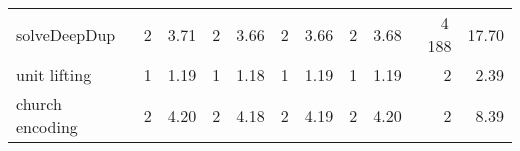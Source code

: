 \begin{tabular}{lrrrrrrrrrr}
\textsf{solveDeepDup}& {\def\@currentlabel{2}\label{stats:SolveDeepDup:Unshared:mem}2} & {\def\@currentlabel{3.71}\label{stats:SolveDeepDup:Unshared:time}3.71}& {\def\@currentlabel{2}\label{stats:SolveDeepDup:Shared:mem}2} & {\def\@currentlabel{3.66}\label{stats:SolveDeepDup:Shared:time}3.66}& {\def\@currentlabel{2}\label{stats:SolveDeepDup:SharedThunk:mem}2} & {\def\@currentlabel{3.66}\label{stats:SolveDeepDup:SharedThunk:time}3.66}& {\def\@currentlabel{2}\label{stats:SolveDeepDup:SharedEvaled:mem}2} & {\def\@currentlabel{3.68}\label{stats:SolveDeepDup:SharedEvaled:time}3.68}& {\def\@currentlabel{4\,188}\label{stats:SolveDeepDup:SharedFull:mem}4\,188} & {\def\@currentlabel{17.70}\label{stats:SolveDeepDup:SharedFull:time}17.70} \\
unit lifting& {\def\@currentlabel{1}\label{stats:Unit:Unshared:mem}1} & {\def\@currentlabel{1.19}\label{stats:Unit:Unshared:time}1.19}& {\def\@currentlabel{1}\label{stats:Unit:Shared:mem}1} & {\def\@currentlabel{1.18}\label{stats:Unit:Shared:time}1.18}& {\def\@currentlabel{1}\label{stats:Unit:SharedThunk:mem}1} & {\def\@currentlabel{1.19}\label{stats:Unit:SharedThunk:time}1.19}& {\def\@currentlabel{1}\label{stats:Unit:SharedEvaled:mem}1} & {\def\@currentlabel{1.19}\label{stats:Unit:SharedEvaled:time}1.19}& {\def\@currentlabel{2}\label{stats:Unit:SharedFull:mem}2} & {\def\@currentlabel{2.39}\label{stats:Unit:SharedFull:time}2.39} \\
church encoding& {\def\@currentlabel{2}\label{stats:Church:Unshared:mem}2} & {\def\@currentlabel{4.20}\label{stats:Church:Unshared:time}4.20}& {\def\@currentlabel{2}\label{stats:Church:Shared:mem}2} & {\def\@currentlabel{4.18}\label{stats:Church:Shared:time}4.18}& {\def\@currentlabel{2}\label{stats:Church:SharedThunk:mem}2} & {\def\@currentlabel{4.19}\label{stats:Church:SharedThunk:time}4.19}& {\def\@currentlabel{2}\label{stats:Church:SharedEvaled:mem}2} & {\def\@currentlabel{4.20}\label{stats:Church:SharedEvaled:time}4.20}& {\def\@currentlabel{2}\label{stats:Church:SharedFull:mem}2} & {\def\@currentlabel{8.39}\label{stats:Church:SharedFull:time}8.39} \\
\end{tabular}
\makeatother
